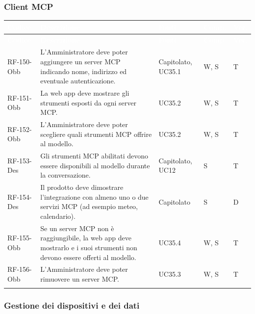 \documentclass[12pt,a4paper]{article}
\newcommand{\thc}[1]{\textcolor{white}{\textbf{#1}}}
\newcommand{\rl}{\\ \arrayrulecolor{bfline}\hline}
\begin{document}
\subsubsection{Client MCP}

\begin{longtable}{>{\raggedright\arraybackslash}p{}>{\raggedright\arraybackslash}p{}>{\raggedright\arraybackslash}p{}>{\raggedright\arraybackslash}p{}>{\centering\arraybackslash}p{}}
\rowcolor{bfblue}\thc{Codice} & \thc{Descrizione} & \thc{Fonti} & \thc{Comp.} & \thc{Ver.} \\
\endfirsthead
\rowcolor{bfblue}\thc{Codice} & \thc{Descrizione} & \thc{Fonti} & \thc{Comp.} & \thc{Ver.} \\
\endhead
RF-150-Obb & L'Amministratore deve poter aggiungere un server MCP indicando nome, indirizzo ed eventuale autenticazione. & Capitolato, UC35.1 & W, S & T \rl
RF-151-Obb & La web app deve mostrare gli strumenti esposti da ogni server MCP. & UC35.2 & W, S & T \rl
RF-152-Obb & L'Amministratore deve poter scegliere quali strumenti MCP offrire al modello. & UC35.2 & W, S & T \rl
RF-153-Des & Gli strumenti MCP abilitati devono essere disponibili al modello durante la conversazione. & Capitolato, UC12 & S & T \rl
RF-154-Des & Il prodotto deve dimostrare l'integrazione con almeno uno o due servizi MCP (ad esempio meteo, calendario). & Capitolato & S & D \rl
RF-155-Obb & Se un server MCP non è raggiungibile, la web app deve mostrarlo e i suoi strumenti non devono essere offerti al modello. & UC35.4 & W, S & T \rl
RF-156-Obb & L'Amministratore deve poter rimuovere un server MCP. & UC35.3 & W, S & T \rl
\end{longtable}

\subsubsection{Gestione dei dispositivi e dei dati}
\end{document}
